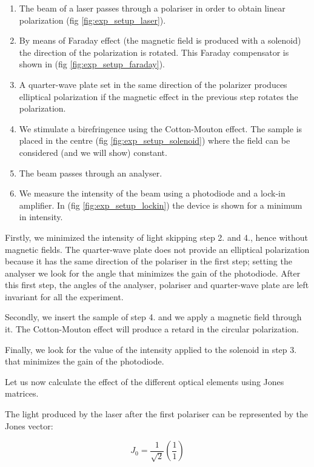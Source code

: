 \documentclass[11pt,a4paper]{article}
\begin{document}
\begin{enumerate}
\item The beam of a laser passes through a polariser in order to obtain linear polarization (fig \ref{fig:exp_setup_laser}).
\item By means of Faraday effect (the magnetic field is produced with a solenoid) the direction of the polarization is rotated. This Faraday compensator is shown in (fig \ref{fig:exp_setup_faraday}).
\item A quarter-wave plate set in the same direction of the polarizer produces elliptical polarization if the magnetic effect in the previous step rotates the polarization.
\item We stimulate a birefringence using the Cotton-Mouton effect. The sample is placed in the centre (fig \ref{fig:exp_setup_solenoid}) where the field can be considered (and we will show) constant.
\item The beam passes through an analyser.
\item We measure the intensity of the beam using a photodiode and a lock-in amplifier. In (fig \ref{fig:exp_setup_lockin}) the device is shown for a minimum in intensity.
\end{enumerate}	

Firstly, we minimized the intensity of light skipping step 2. and 4., hence without magnetic fields.  The quarter-wave plate does not provide an elliptical polarization because it has the same direction of the polariser in the first step; setting the analyser we look for the angle that minimizes the gain of the photodiode. After this first step, the angles of the analyser, polariser and quarter-wave plate are left invariant for all the experiment.

Secondly, we insert the sample of step 4. and we apply a magnetic field through it. The Cotton-Mouton effect will produce a retard in the circular polarization. 

Finally, we look for the value of the intensity applied to the solenoid in step 3. that minimizes the gain of the photodiode. 

Let us now calculate the effect of the different optical elements using Jones matrices.

The light produced by the laser after the first polariser can be represented by the Jones vector:

\begin{equation}\label{eq:initial_jones}
J_0=\frac{1}{\sqrt{2}}\left(\frac{1}{1}\right)
\end{equation}
\end{document}
